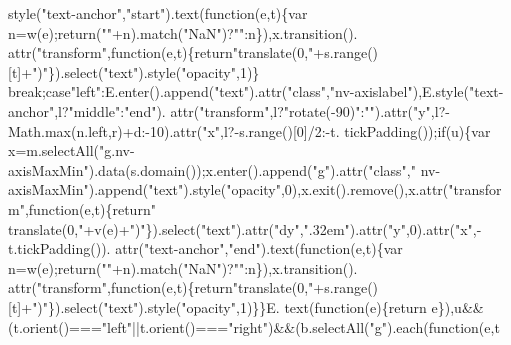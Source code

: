 \begin{DoxyCode}
      style(\textcolor{stringliteral}{"text-anchor"},\textcolor{stringliteral}{"start"}).text(\textcolor{keyword}{function}(e,t)\{var n=w(e);\textcolor{keywordflow}{return}(\textcolor{stringliteral}{""}+n).match(\textcolor{stringliteral}{"NaN"})?\textcolor{stringliteral}{""}:n\}),x.transition().
      attr(\textcolor{stringliteral}{"transform"},\textcolor{keyword}{function}(e,t)\{\textcolor{keywordflow}{return}\textcolor{stringliteral}{"translate(0,"}+s.range()[t]+\textcolor{stringliteral}{")"}\}).select(\textcolor{stringliteral}{"text"}).style(\textcolor{stringliteral}{"opacity"},1)\}\textcolor{keywordflow}{
      break};\textcolor{keywordflow}{case}\textcolor{stringliteral}{"left"}:E.enter().append(\textcolor{stringliteral}{"text"}).attr(\textcolor{stringliteral}{"class"},\textcolor{stringliteral}{"nv-axislabel"}),E.style(\textcolor{stringliteral}{"text-anchor"},l?\textcolor{stringliteral}{"middle"}:\textcolor{stringliteral}{"end"}).
      attr(\textcolor{stringliteral}{"transform"},l?\textcolor{stringliteral}{"rotate(-90)"}:\textcolor{stringliteral}{""}).attr(\textcolor{stringliteral}{"y"},l?-Math.max(n.left,r)+d:-10).attr(\textcolor{stringliteral}{"x"},l?-s.range()[0]/2:-t.
      tickPadding());\textcolor{keywordflow}{if}(u)\{var x=m.selectAll(\textcolor{stringliteral}{"g.nv-axisMaxMin"}).data(s.domain());x.enter().append(\textcolor{stringliteral}{"g"}).attr(\textcolor{stringliteral}{"class"},\textcolor{stringliteral}{"
      nv-axisMaxMin"}).append(\textcolor{stringliteral}{"text"}).style(\textcolor{stringliteral}{"opacity"},0),x.exit().remove(),x.attr(\textcolor{stringliteral}{"transform"},\textcolor{keyword}{function}(e,t)\{\textcolor{keywordflow}{return}\textcolor{stringliteral}{"
      translate(0,"}+v(e)+\textcolor{stringliteral}{")"}\}).select(\textcolor{stringliteral}{"text"}).attr(\textcolor{stringliteral}{"dy"},\textcolor{stringliteral}{".32em"}).attr(\textcolor{stringliteral}{"y"},0).attr(\textcolor{stringliteral}{"x"},-t.tickPadding()).
      attr(\textcolor{stringliteral}{"text-anchor"},\textcolor{stringliteral}{"end"}).text(\textcolor{keyword}{function}(e,t)\{var n=w(e);\textcolor{keywordflow}{return}(\textcolor{stringliteral}{""}+n).match(\textcolor{stringliteral}{"NaN"})?\textcolor{stringliteral}{""}:n\}),x.transition().
      attr(\textcolor{stringliteral}{"transform"},\textcolor{keyword}{function}(e,t)\{\textcolor{keywordflow}{return}\textcolor{stringliteral}{"translate(0,"}+s.range()[t]+\textcolor{stringliteral}{")"}\}).select(\textcolor{stringliteral}{"text"}).style(\textcolor{stringliteral}{"opacity"},1)\}\}E.
      text(\textcolor{keyword}{function}(e)\{\textcolor{keywordflow}{return} e\}),u&&(t.orient()===\textcolor{stringliteral}{"left"}||t.orient()===\textcolor{stringliteral}{"right"})&&(b.selectAll(\textcolor{stringliteral}{"g"}).each(\textcolor{keyword}{function}(e,t

\end{DoxyCode}
